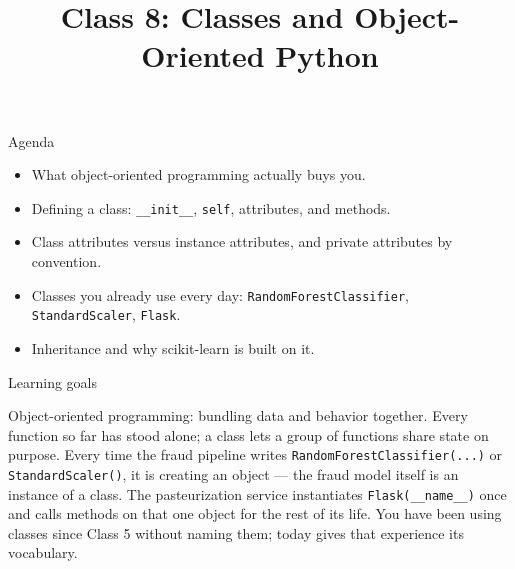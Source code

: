 

\title{Class 8: Classes and Object-Oriented Python}
\author{\coursename}
\date{}



\frame{\titlepage \coursefooter}

\begin{frame}{Agenda}
\begin{itemize}
\item What object-oriented programming actually buys you.
\item Defining a class: \texttt{\_\_init\_\_}, \texttt{self}, attributes, and methods.
\item Class attributes versus instance attributes, and private attributes by convention.
\item Classes you already use every day: \texttt{RandomForestClassifier}, \texttt{StandardScaler}, \texttt{Flask}.
\item Inheritance and why scikit-learn is built on it.
\end{itemize}
\coursefooter
\end{frame}

\begin{frame}{Learning goals}
\coursefooter
\end{frame}

\coursecontextframe
{Object-oriented programming: bundling data and behavior together.}
{Every function so far has stood alone; a class lets a group of functions share state on purpose.}
{Every time the fraud pipeline writes \texttt{RandomForestClassifier(...)} or \texttt{StandardScaler()}, it is creating an object --- the fraud model itself is an instance of a class.}
{The pasteurization service instantiates \texttt{Flask(\_\_name\_\_)} once and calls methods on that one object for the rest of its life.}
{You have been using classes since Class 5 without naming them; today gives that experience its vocabulary.}

